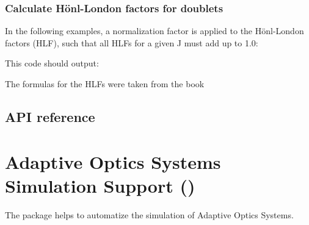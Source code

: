 \documentclass[letterpaper,10pt,english]{sphinxmanual}
\begin{document}
\subsection{Calculate Hönl-London factors for doublets}
\label{\detokenize{physics:calculate-honl-london-factors-for-doublets}}
In the following examples, a normalization factor is applied to the Hönl-London factors (HLF),
such that all HLFs for a given J must add up to 1.0:

\begin{sphinxVerbatim}[commandchars=\\\{\}]
     
      
  
  
  \PYG{p}{[}     \PYG{p}{]}
\end{sphinxVerbatim}

This code should output:

\begin{sphinxVerbatim}[commandchars=\\\{\}]
\end{sphinxVerbatim}

The formulas for the HLFs were taken from the book 


\section{API reference}
\label{\detokenize{physics:api-reference}}


\chapter{Adaptive Optics Systems Simulation Support ()}
\label{\detokenize{aosss:adaptive-optics-systems-simulation-support-f311-aosss}}\label{\detokenize{aosss::doc}}
The  package helps to automatize the simulation of Adaptive Optics Systems.
\end{document}
